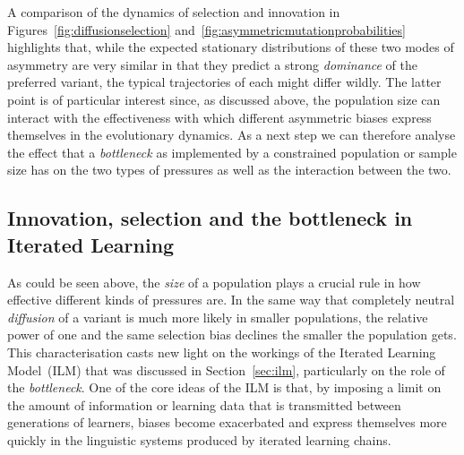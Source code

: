 A comparison of the dynamics of selection and innovation in Figures~\ref{fig:diffusionselection} and~\ref{fig:asymmetricmutationprobabilities} highlights that, while the expected stationary distributions of these two modes of asymmetry are very similar in that they predict a strong \emph{dominance} of the preferred variant, the typical trajectories of each might differ wildly.
The latter point is of particular interest since, as discussed above, the population size can interact with the effectiveness with which different asymmetric biases express themselves in the evolutionary dynamics. As a next step we can therefore analyse the effect that a \emph{bottleneck} as implemented by a constrained population or sample size has on the two types of pressures as well as the interaction between the two.


\subsection{Innovation, selection and the bottleneck in Iterated Learning}

As could be seen above, the \emph{size} of a population plays a crucial rule in how effective different kinds of pressures are. In the same way that completely neutral \emph{diffusion} of a variant is much more likely in smaller populations, %
the relative power of one and the same selection bias declines the smaller the population gets. This characterisation casts new light on the workings of the Iterated Learning Model~(ILM) that was discussed in Section~\ref{sec:ilm}, particularly on the role of the \emph{bottleneck}.
One of the core ideas of the ILM is that, by imposing a limit on the amount of information or learning data that is transmitted between generations of learners, biases become exacerbated and express themselves more quickly in the linguistic systems produced by iterated learning chains.

